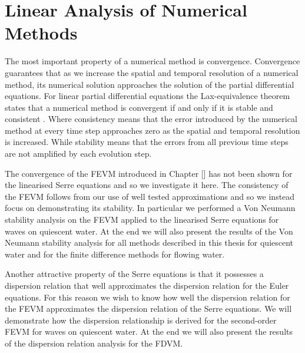 
\chapter{Linear Analysis of Numerical Methods}
\label{chp:AnalNumMethod}
The most important property of a numerical method is convergence. Convergence guarantees that as we increase the spatial and temporal resolution of a numerical method, its numerical solution approaches the solution of the partial differential equations. For linear partial differential equations the Lax-equivalence theorem states that a numerical method is convergent if and only if it is stable and consistent \cite{Lax-Richtmyer-1956-267}. Where consistency means that the error introduced by the numerical method at every time step approaches zero as the spatial and temporal resolution is increased. While stability means that the errors from all previous time steps are not amplified by each evolution step.

The convergence of the FEVM introduced in Chapter [] has not been shown for the linearised Serre equations and so we investigate it here. The consistency of the FEVM follows from our use of well tested approximations and so we instead focus on demonstrating its stability. In particular we performed a Von Neumann stability \cite{Charney-etal-1950-237} analysis on the FEVM applied to the linearised Serre equations for waves on quiescent water. At the end we will also present the results of the Von Neumann stability analysis for all methods described in this thesis for quiescent water and for the finite difference methods for flowing water.

Another attractive property of the Serre equations is that it possesses a dispersion relation that well approximates the dispersion relation for the Euler equations. For this reason we wish to know how well the dispersion relation for the FEVM approximates the dispersion relation of the Serre equations. We will demonstrate how the dispersion relationship is derived for the second-order FEVM for waves on quiescent water. At the end we will also present the results of the dispersion relation analysis for the FDVM.

